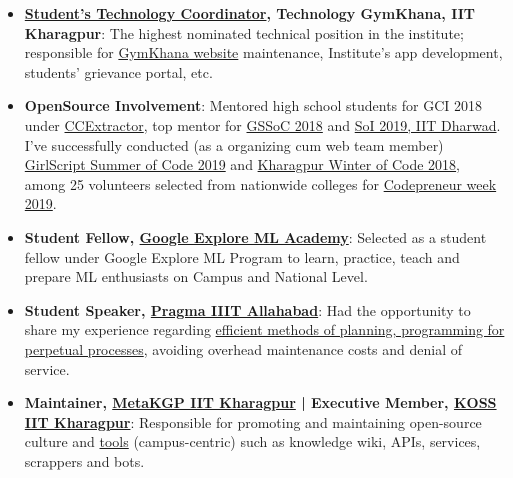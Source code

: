 \documentclass[a4paper,10pt]{extarticle} %
\begin{document}
\begin{itemize}[leftmargin=0.55cm, rightmargin=0.2cm, label={\Large\textbullet}]

\item \textbf{\href{https://wiki.metakgp.org/w/Constitution_of_the_Technology_Students\%27_Gymkhana#1._TECHNOLOGY_COORDINATOR:}{Student's Technology Coordinator}, Technology GymKhana, IIT Kharagpur}: The highest nominated technical position in the institute; responsible for \href{http://gymkhana.iitkgp.ac.in/index.php}{GymKhana website} maintenance, Institute's app development, students' grievance portal, etc.

\item \textbf{OpenSource Involvement}: Mentored high school students for GCI 2018 under \href{https://codein.withgoogle.com/organizations/ccextractor-development/}{CCExtractor}, top mentor for \href{https://www.gssoc.tech/}{GSSoC 2018} and \href{https://oss2019.github.io/SoI.html}{SoI 2019, IIT Dharwad}. I've successfully conducted (as a organizing cum web team member) \href{https://gssoc.tech/}{GirlScript Summer of Code 2019} and \href{https://kwoc.kossiitkgp.org/}{Kharagpur Winter of Code 2018}, among 25 volunteers selected from nationwide colleges for \href{http://codepreneur.in}{Codepreneur week 2019}.

\item \textbf{Student Fellow, \href{https://events.withgoogle.com/explore-ml-in/}{Google Explore ML Academy}}: Selected as a student fellow under Google Explore ML Program to learn, practice, teach and prepare ML enthusiasts on Campus and National Level.

\item \textbf{Student Speaker, \href{http://pragmaconf.tech}{Pragma IIIT Allahabad}}: Had the opportunity to share my experience regarding \href{https://prezi.com/view/tf50MBbGtm9FgPKQfieI/}{efficient methods of planning, programming for perpetual processes}, avoiding overhead maintenance costs and denial of service.

\item \textbf{Maintainer, \href{https://wiki.metakgp.org/w/Metakgp:About}{MetaKGP IIT Kharagpur} | Executive Member, \href{https://kossiitkgp.org/about/index.html}{KOSS IIT Kharagpur}}: Responsible for promoting and maintaining open-source culture and \href{https://github.com/metakgp/}{tools} (campus-centric) such as knowledge wiki, APIs, services, scrappers and bots.
\end{itemize}
\end{document}
